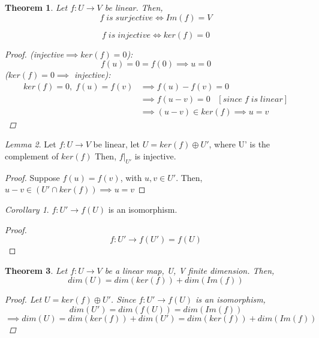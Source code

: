 \documentclass[12pt]{article}
\newtheorem{theorem}{Theorem}[section]
\theoremstyle{definition}
\theoremstyle{remark}
\newtheorem{corollary}{Corollary}[theorem]
\newtheorem{lemma}[theorem]{Lemma}
\begin{document}
    \begin{theorem}
        Let $f: U\rightarrow V$ be linear. Then, $$f \; is \; surjective \iff Im(f) =V$$

        $$f \; is \; injective \iff ker(f)= 0$$
        \begin{proof}
            (injective$\implies ker(f) =0$): 
            $$f(u)=0=f(0)\implies u=0$$
            \newline($ker(f) =0 \implies$ injective): 
            \begin{align*}
            ker(f) = 0, \; f(u)= f(v) &\implies f(u)-f(v)=0 \\
                                      &\implies f(u-v)= 0 \; \; \; [since \; f \; is \; linear] \\
                                      &\implies (u-v) \in ker(f) \implies u=v
            \end{align*}
        \end{proof}

    \end{theorem}
    \begin{lemma}
        Let $f:U\rightarrow V$ be linear, let $U = ker(f)\oplus U'$, where U' is the complement of $ker(f)$
        Then, $f|_{U'}$ is injective.
        \begin{proof}
            Suppose $f(u)=f(v)$, with $u,v \in U'$. Then, $u-v\in (U' \cap ker(f))\implies u=v$
        \end{proof}
    \end{lemma}
    \begin{corollary}
        $f: U' \rightarrow f(U)$ is an isomorphism.
        \begin{proof}
            $$f:U' \rightarrow f(U')=f(U)$$
        \end{proof}
    \end{corollary}
    \begin{theorem}
        Let $f:U\rightarrow V$ be a linear map, U, V finite dimension. Then, 
        $$ dim(U) = dim(ker(f))+ dim(Im(f))$$

        \begin{proof}
            Let $U= ker(f) \oplus U'$. Since $f: U'\rightarrow  f(U)$
            is an isomorphism, $$dim(U')  = dim (f(U))= dim (Im(f))$$
            $$ \implies dim(U)= dim (ker(f)) + dim (U') = dim(ker(f)) + dim (Im(f))$$
        \end{proof}
    \end{theorem}
\end{document}
